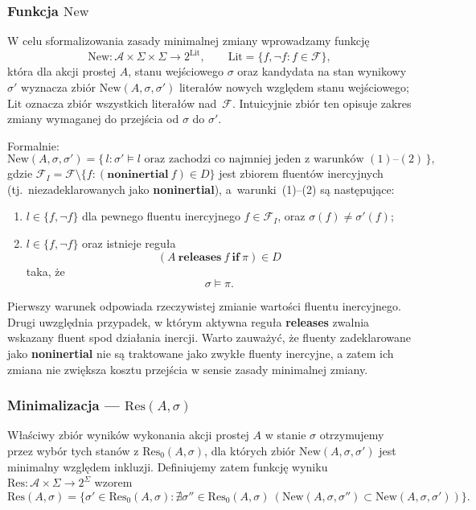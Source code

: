 \documentclass[11pt,a4paper]{article}
\newcommand{\noninertial}{\textbf{noninertial}}
\theoremstyle{definition}
\begin{document}
\subsubsection{Funkcja \texorpdfstring{$\mathrm{New}$}{New}}

W celu sformalizowania zasady minimalnej zmiany wprowadzamy funkcję
\[
\mathrm{New} : \mathcal{A} \times \Sigma \times \Sigma \to 2^{\mathrm{Lit}},
\qquad \mathrm{Lit} = \{f, \neg f : f \in \mathcal{F}\},
\]
która dla akcji prostej $A$, stanu wejściowego $\sigma$ oraz kandydata na stan wynikowy $\sigma'$ wyznacza zbiór $\mathrm{New}(A,\sigma,\sigma')$ literałów nowych względem stanu wejściowego; $\mathrm{Lit}$ oznacza zbiór wszystkich literałów nad~$\mathcal{F}$. Intuicyjnie zbiór ten opisuje zakres zmiany wymaganej do przejścia od $\sigma$ do $\sigma'$.

Formalnie:
\[
\mathrm{New}(A,\sigma,\sigma')=
\{\, l : \sigma' \models l \text{ oraz zachodzi co najmniej jeden z warunków } (1)\text{--}(2)\,\},
\]
gdzie $\mathcal{F}_I = \mathcal{F} \setminus \{f : (\noninertial{}\ f)\in D\}$ jest zbiorem fluentów inercyjnych (tj.\ niezadeklarowanych jako \noninertial{}), a~warunki~(1)--(2) są następujące:
\begin{enumerate}
    \item $l \in \{f, \neg f\}$ dla pewnego fluentu inercyjnego $f \in \mathcal{F}_I$, oraz $\sigma(f)\neq \sigma'(f)$;
    \item $l \in \{f, \neg f\}$ oraz istnieje reguła
    \[
    (A\ \textbf{releases}\ f\ \textbf{if}\ \pi)\in D
    \]
    taka, że
    \[
    \sigma \models \pi.
    \]
\end{enumerate}

Pierwszy warunek odpowiada rzeczywistej zmianie wartości fluentu inercyjnego. Drugi uwzględnia przypadek, w którym aktywna reguła \textbf{releases} zwalnia wskazany fluent spod działania inercji. Warto zauważyć, że fluenty zadeklarowane jako \textbf{noninertial} nie są traktowane jako zwykłe fluenty inercyjne, a zatem ich zmiana nie zwiększa kosztu przejścia w sensie zasady minimalnej zmiany.

\subsubsection{Minimalizacja --- \texorpdfstring{$\mathrm{Res}(A, \sigma)$}{Res(A,sigma)}}
\label{sec:minimalizacja}

Właściwy zbiór wyników wykonania akcji prostej $A$ w stanie $\sigma$ otrzymujemy przez wybór tych stanów z $\mathrm{Res}_0(A,\sigma)$, dla których zbiór $\mathrm{New}(A,\sigma,\sigma')$ jest minimalny względem inkluzji. Definiujemy zatem funkcję wyniku $\mathrm{Res} : \mathcal{A} \times \Sigma \to 2^{\Sigma}$ wzorem
\[
\mathrm{Res}(A,\sigma)=
\{\sigma' \in \mathrm{Res}_0(A,\sigma) :
\nexists \sigma'' \in \mathrm{Res}_0(A,\sigma)\ 
(\mathrm{New}(A,\sigma,\sigma'') \subset \mathrm{New}(A,\sigma,\sigma'))\}.
\]
\end{document}
